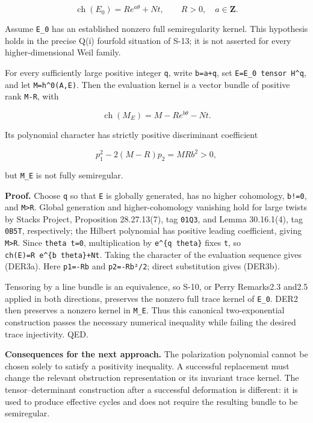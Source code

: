 \documentclass[11pt,a4paper]{article}
\theoremstyle{definition}
\begin{document}
\[
 \operatorname{ch}(E_0)=R e^{a\theta}+N t,
 \qquad R>0,\quad a\in\mathbf Z.
\]

Assume \texttt{E\_0} has an established nonzero full semiregularity
kernel. This hypothesis holds in the precise Q(i) fourfold situation of
S-13; it is not asserted for every higher-dimensional Weil family.

For every sufficiently large positive integer \texttt{q}, write
\texttt{b=a+q}, set \texttt{E=E\_0\ tensor\ H\^{}q}, and let
\texttt{M=h\^{}0(A,E)}. Then the evaluation kernel is a vector bundle of
positive rank \texttt{M-R}, with

\[
 \operatorname{ch}(M_E)
 =M-R e^{b\theta}-N t.
\tag{DER3a}
\]

Its polynomial character has strictly positive discriminant coefficient

\[
 p_1^2-2(M-R)p_2=MRb^2>0,
\tag{DER3b}
\]

but \texttt{M\_E} is not fully semiregular.

\textbf{Proof.} Choose \texttt{q} so that \texttt{E} is globally
generated, has no higher cohomology, \texttt{b!=0}, and
\texttt{M\textgreater{}R}. Global generation and higher-cohomology
vanishing hold for large twists by Stacks Project, Proposition
28.27.13(7), tag \texttt{01Q3}, and Lemma 30.16.1(4), tag \texttt{0B5T},
respectively; the Hilbert polynomial has positive leading coefficient,
giving \texttt{M\textgreater{}R}. Since \texttt{theta\ t=0},
multiplication by \texttt{e\^{}\{q\ theta\}} fixes \texttt{t}, so
\texttt{ch(E)=R\ e\^{}\{b\ theta\}+Nt}. Taking the character of the
evaluation sequence gives (DER3a). Here \texttt{p1=-Rb} and
\texttt{p2=-Rb²/2}; direct substitution gives (DER3b).

Tensoring by a line bundle is an equivalence, so S-10, or Perry
Remarks2.3 and2.5 applied in both directions, preserves the nonzero full
trace kernel of \texttt{E\_0}. DER2 then preserves a nonzero kernel in
\texttt{M\_E}. Thus this canonical two-exponential construction passes
the necessary numerical inequality while failing the desired trace
injectivity. QED.

\textbf{Consequences for the next approach.} The polarization polynomial
cannot be chosen solely to satisfy a positivity inequality. A successful
replacement must change the relevant obstruction representation or its
invariant trace kernel. The tensor--determinant construction after a
successful deformation is different: it is used to produce effective
cycles and does not require the resulting bundle to be semiregular.
\end{document}
